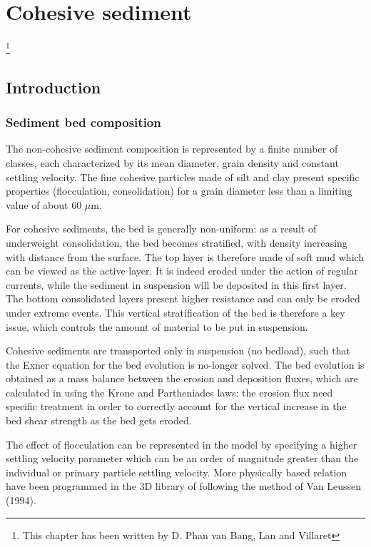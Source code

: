 \section{Cohesive sediment}\label{ch:cohesive}\footnote{This chapter has been written by D. Phan van Bang, Lan and Villaret}


\subsection{Introduction}
\subsubsection{Sediment bed composition}
The non-cohesive sediment composition is represented by a finite number of
classes, each characterized by its mean diameter, grain density and constant
settling velocity. The fine cohesive particles made of silt and clay present
specific properties (flocculation, consolidation) for a grain diameter less
than a limiting value of about 60 $\mu$m.

For cohesive sediments, the bed is generally non-uniform: as a result of
underweight consolidation, the bed becomes stratified, with density
increasing with distance from the surface. The top layer is therefore made
of soft mud which can be viewed as the active layer. It is indeed eroded
under the action of regular currents, while the sediment in suspension will
be deposited in this first layer. The bottom consolidated layers present
higher resistance and can only be eroded under extreme events. This vertical
stratification of the bed is therefore a key issue, which controls the
amount of material to be put in suspension. 

Cohesive sediments are transported only in suspension (no bedload), such
that the Exner equation for the bed evolution is no-longer solved. The bed
evolution is obtained as a mass balance between the erosion and deposition
fluxes, which are calculated in \sisyphe using the Krone and Partheniades
laws: the erosion flux need specific treatment in order to correctly account
for the vertical increase in the bed shear strength as the bed gets eroded.

The effect of flocculation can be represented in the model by specifying a
higher settling velocity parameter which can be an order of magnitude
greater than the individual or primary particle settling velocity. More
physically based relation have been programmed in the 3D library of \telddd
following the method of Van Leussen (1994).

